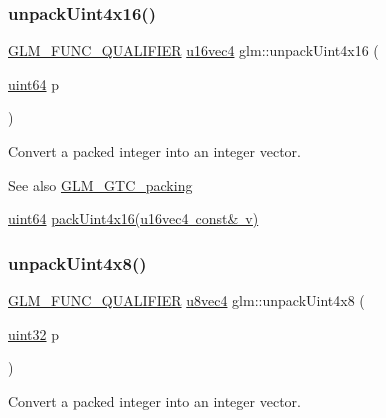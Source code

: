 \subsubsection{\texorpdfstring{unpack\+Uint4x16()}{unpackUint4x16()}}
{\footnotesize\ttfamily \mbox{\hyperlink{setup_8hpp_a33fdea6f91c5f834105f7415e2a64407}{G\+L\+M\+\_\+\+F\+U\+N\+C\+\_\+\+Q\+U\+A\+L\+I\+F\+I\+ER}} \mbox{\hyperlink{group__gtc__type__precision_ga049d45ad8d0f78578d7ceb86a7fdaae4}{u16vec4}} glm\+::unpack\+Uint4x16 (\begin{DoxyParamCaption}\item[{\mbox{\hyperlink{group__gtc__type__precision_gae3632bf9b37da66233d78930dd06378a}{uint64}}}]{p }\end{DoxyParamCaption})}

Convert a packed integer into an integer vector.

\begin{DoxySeeAlso}{See also}
\mbox{\hyperlink{group__gtc__packing}{G\+L\+M\+\_\+\+G\+T\+C\+\_\+packing}} 

\mbox{\hyperlink{group__gtc__type__precision_gae3632bf9b37da66233d78930dd06378a}{uint64}} \mbox{\hyperlink{group__gtc__packing_ga19813cb34dd7102f9612ba6c0d9ef377}{pack\+Uint4x16(u16vec4 const\& v)}} 
\end{DoxySeeAlso}
\mbox{\label{group__gtc__packing_ga99229dc6cb31d82c39a324d5753792c6}} 
\subsubsection{\texorpdfstring{unpack\+Uint4x8()}{unpackUint4x8()}}
{\footnotesize\ttfamily \mbox{\hyperlink{setup_8hpp_a33fdea6f91c5f834105f7415e2a64407}{G\+L\+M\+\_\+\+F\+U\+N\+C\+\_\+\+Q\+U\+A\+L\+I\+F\+I\+ER}} \mbox{\hyperlink{group__gtc__type__precision_ga6c8841fa492bd5b1078b171452fd6974}{u8vec4}} glm\+::unpack\+Uint4x8 (\begin{DoxyParamCaption}\item[{\mbox{\hyperlink{group__gtc__type__precision_ga202b6a53c105fcb7e531f9b443518451}{uint32}}}]{p }\end{DoxyParamCaption})}

Convert a packed integer into an integer vector.

